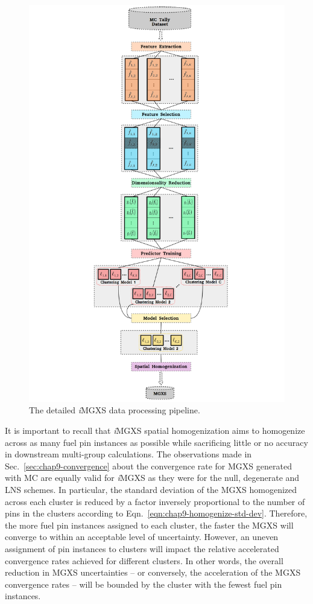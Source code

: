 \begin{figure}[h!]
\centering
\includegraphics[width=0.9\linewidth]{figures/unsupervised/features/engineering/flow-chart}
\vspace{2mm}
\caption[\textit{i}MGXS detailed data processing pipeline]{The detailed \textit{i}\ac{MGXS} data processing pipeline.}
\label{fig:chap10-imgxs-pipeline}
\end{figure}

It is important to recall that \textit{i}\ac{MGXS} spatial homogenization aims to homogenize across as many fuel pin instances as possible while sacrificing little or no accuracy in downstream multi-group calculations. The observations made in Sec.~\ref{sec:chap9-convergence} about the convergence rate for \ac{MGXS} generated with \ac{MC} are equally valid for \textit{i}\ac{MGXS} as they were for the null, degenerate and \ac{LNS} schemes. In particular, the standard deviation of the \ac{MGXS} homogenized across each cluster is reduced by a factor inversely proportional to the number of pins in the clusters according to Eqn.~\ref{eqn:chap9-homogenize-std-dev}. Therefore, the more fuel pin instances assigned to each cluster, the faster the \ac{MGXS} will converge to within an acceptable level of uncertainty. However, an uneven assignment of pin instances to clusters will impact the relative accelerated convergence rates achieved for different clusters. In other words, the overall reduction in \ac{MGXS} uncertainties -- or conversely, the acceleration of the \ac{MGXS} convergence rates -- will be bounded by the cluster with the fewest fuel pin instances.

